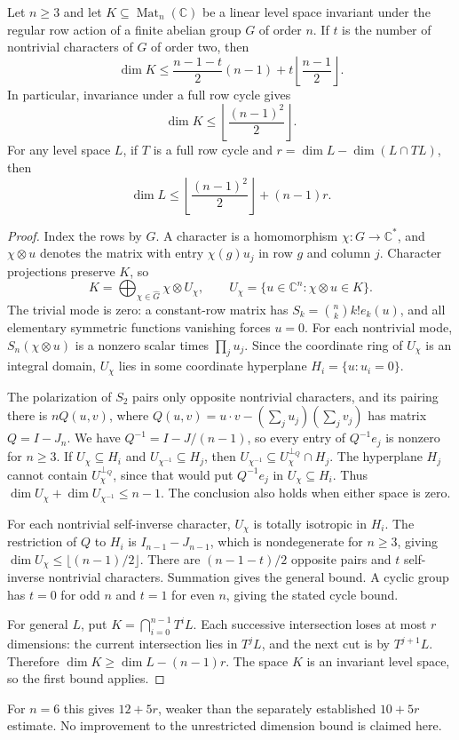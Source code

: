 \begin{theorem}\label{thm:abelian-rows}
Let $n\geq3$ and let $K\subseteq\operatorname{Mat}_n(\mathbb C)$
be a linear level space invariant under the regular row action of a
finite abelian group $G$ of order $n$. If $t$ is the number of
nontrivial characters of $G$ of order two, then
\[
 \dim K\leq\frac{n-1-t}{2}(n-1)
       +t\left\lfloor\frac{n-1}{2}\right\rfloor.
\]
In particular, invariance under a full row cycle gives
\[
 \dim K\leq\left\lfloor\frac{(n-1)^2}{2}\right\rfloor.
\]
For any level space $L$, if $T$ is a full row cycle and
$r=\dim L-\dim(L\cap TL)$, then
\[
 \dim L\leq\left\lfloor\frac{(n-1)^2}{2}\right\rfloor+(n-1)r.
\]
\end{theorem}
\begin{proof}
Index the rows by $G$. A character is a homomorphism $\chi:G\to\mathbb C^*$, and $\chi\otimes u$ denotes the matrix with entry $\chi(g)u_j$ in row $g$ and column $j$. Character projections preserve $K$, so
\[
 K=\bigoplus_{\chi\in\widehat G}\chi\otimes U_\chi,
 \qquad U_\chi=\{u\in\mathbb C^n:\chi\otimes u\in K\}.
\]
The trivial mode is zero: a constant-row matrix has
$S_k=\binom nk k!e_k(u)$, and all elementary symmetric functions
vanishing forces $u=0$. For each nontrivial mode,
$S_n(\chi\otimes u)$ is a nonzero scalar times $\prod_j u_j$.
Since the coordinate ring of $U_\chi$ is an integral domain,
$U_\chi$ lies in some coordinate hyperplane $H_i=\{u:u_i=0\}$.

The polarization of $S_2$ pairs only opposite nontrivial characters,
and its pairing there is $nQ(u,v)$, where
$Q(u,v)=u\cdot v-(\sum_j u_j)(\sum_j v_j)$ has matrix $Q=I-J_n$.
We have $Q^{-1}=I-J/(n-1)$, so every entry of $Q^{-1}e_j$ is
nonzero for $n\geq3$. If $U_\chi\subseteq H_i$ and
$U_{\chi^{-1}}\subseteq H_j$, then
$U_{\chi^{-1}}\subseteq U_\chi^{\perp_Q}\cap H_j$.
The hyperplane $H_j$ cannot contain $U_\chi^{\perp_Q}$, since that
would put $Q^{-1}e_j$ in $U_\chi\subseteq H_i$.
Thus $\dim U_\chi+\dim U_{\chi^{-1}}\leq n-1$.
The conclusion also holds when either space is zero.

For each nontrivial self-inverse character, $U_\chi$ is
totally isotropic in $H_i$. The restriction of $Q$ to $H_i$ is
$I_{n-1}-J_{n-1}$, which is nondegenerate for $n\geq3$, giving
$\dim U_\chi\leq\lfloor(n-1)/2\rfloor$.
There are $(n-1-t)/2$ opposite pairs and $t$ self-inverse
nontrivial characters. Summation gives the general bound. A cyclic
group has $t=0$ for odd $n$ and $t=1$ for even $n$, giving the stated
cycle bound.

For general $L$, put $K=\bigcap_{i=0}^{n-1}T^iL$.
Each successive intersection loses at most $r$ dimensions:
the current intersection lies in $T^jL$, and the next cut is by
$T^{j+1}L$. Therefore $\dim K\geq\dim L-(n-1)r$.
The space $K$ is an invariant level space, so the first bound applies.
\end{proof}
For $n=6$ this gives $12+5r$, weaker than the separately established
$10+5r$ estimate. No improvement to the unrestricted dimension bound is
claimed here.

